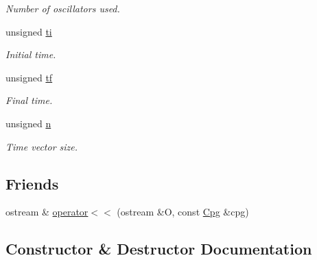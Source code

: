 \begin{DoxyCompactItemize}
\begin{DoxyCompactList}\small\item\em Number of oscillators used. \end{DoxyCompactList}\item 
unsigned \hyperlink{classCpg_ae22d05d6332474232e17951527266c5e}{ti}\hypertarget{classCpg_ae22d05d6332474232e17951527266c5e}{}\label{classCpg_ae22d05d6332474232e17951527266c5e}

\begin{DoxyCompactList}\small\item\em Initial time. \end{DoxyCompactList}\item 
unsigned \hyperlink{classCpg_ac0c4c837f76afff78feb182fe840d9b2}{tf}\hypertarget{classCpg_ac0c4c837f76afff78feb182fe840d9b2}{}\label{classCpg_ac0c4c837f76afff78feb182fe840d9b2}

\begin{DoxyCompactList}\small\item\em Final time. \end{DoxyCompactList}\item 
unsigned \hyperlink{classCpg_a5efba1ac4cbe88af80904a7d165f109a}{n}\hypertarget{classCpg_a5efba1ac4cbe88af80904a7d165f109a}{}\label{classCpg_a5efba1ac4cbe88af80904a7d165f109a}

\begin{DoxyCompactList}\small\item\em Time vector size. \end{DoxyCompactList}\end{DoxyCompactItemize}
\subsection*{Friends}
\begin{DoxyCompactItemize}
\item 
ostream \& \hyperlink{classCpg_ae3aff148754c0919347bdab8801e0d25}{operator$<$$<$} (ostream \&O, const \hyperlink{classCpg}{Cpg} \&cpg)
\end{DoxyCompactItemize}


\subsection{Constructor \& Destructor Documentation}

